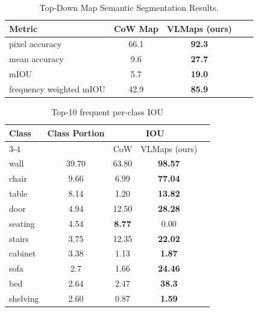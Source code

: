 \documentclass[letterpaper, 10 pt, conference]{ieeeconf}  %
\begin{document}
\begin{table}[h]
  \setlength\tabcolsep{5.2pt}
  \centering
  \begin{tabular}{lcccc}
  \toprule

    Metric              & CoW Map            & VLMaps (ours)                      \\
\midrule
pixel accuracy          & 66.1                  & \textbf{92.3}                                       \\
mean accuracy           & 9.6                  & \textbf{27.7}                                        \\
mIOU                    & 5.7                  & \textbf{19.0}                \\
frequency weighted mIOU & 42.9                  & \textbf{85.9}                \\
  \bottomrule
  \end{tabular}
  \caption{Top-Down Map Semantic Segmentation Results.}
  \label{table:seg_iou}
\end{table}



\begin{table}[h]
  \setlength\tabcolsep{5.2pt}
  \centering
  \begin{tabular}{lcccc}
  \toprule

Class    & Class Portion      & \multicolumn{2}{c}{IOU}       \\                
                                \cmidrule(lr){3-4}\
         &                    & CoW               & VLMaps (ours) \\
\midrule
wall     & 39.70              & 63.80             & \textbf{98.57}                      \\
chair    & 9.66               & 6.99              & \textbf{77.04}                      \\
table    & 8.14               & 1.20              & \textbf{13.82}                      \\
door     & 4.94               & 12.50             & \textbf{28.28}                      \\
seating  & 4.54               & \textbf{8.77}     & 0.00                                \\
stairs   & 3.75               & 12.35             & \textbf{22.02}                      \\
cabinet  & 3.38               & 1.13              & \textbf{1.87}                       \\
sofa     & 2.7                & 1.66              & \textbf{24.46}                      \\
bed      & 2.64               & 2.47              & \textbf{38.3}                       \\
shelving & 2.60               & 0.87              & \textbf{1.59}                       \\

  \bottomrule
  \end{tabular}
  \caption{Top-10 frequent per-class IOU}
  \label{table:seg_class}
\end{table}
\end{document}
